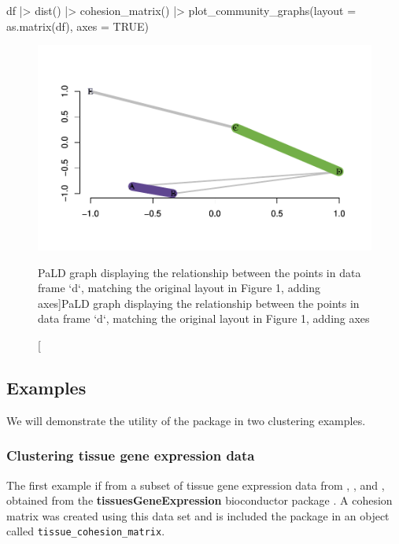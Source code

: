 \begin{Schunk}
\begin{Sinput}
df |>
  dist() |>
  cohesion_matrix() |>
  plot_community_graphs(layout = as.matrix(df),
                        axes = TRUE)
\end{Sinput}
\begin{figure}
\includegraphics{manuscript_files/figure-latex/fig4-1} \caption[PaLD graph displaying the relationship between the points in data frame `d`, matching the original layout in Figure 1, adding axes]{PaLD graph displaying the relationship between the points in data frame `d`, matching the original layout in Figure 1, adding axes}\label{fig:fig4}
\end{figure}
\end{Schunk}

\hypertarget{examples}{%
\subsection{Examples}\label{examples}}

We will demonstrate the utility of the  package in two
clustering examples.

\hypertarget{clustering-tissue-gene-expression-data}{%
\subsubsection{Clustering tissue gene expression
data}\label{clustering-tissue-gene-expression-data}}

The first example if from a subset of tissue gene expression data from
\citet{zilliox2007gene}, \citet{mccall2011gene}, and
\citet{mccall2014gene}, obtained from the \textbf{tissuesGeneExpression}
bioconductor package \citep{tissue}. A cohesion matrix was created using
this data set and is included the  package in an object
called \texttt{tissue\_cohesion\_matrix}.

